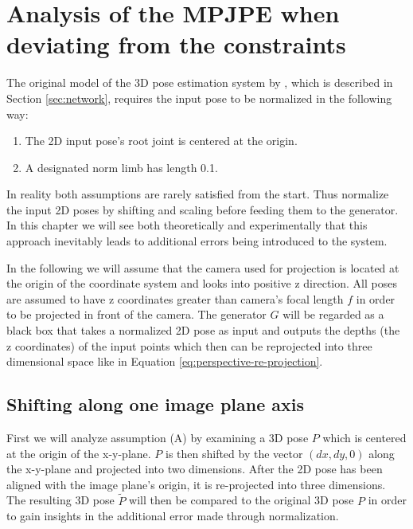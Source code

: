 \section{Analysis of the MPJPE when deviating from the constraints}

The original model of the 3D pose estimation system by \citet{drover18}, which is described in Section \ref{sec:network}, requires the input pose to be normalized in the following way:
\begin{enumerate}[label=(\Alph*)]
	\item The 2D input pose's root joint is centered at the origin.
	\item A designated norm limb has length 0.1.
\end{enumerate}

In reality both assumptions are rarely satisfied from the start.
Thus \citet{drover18} normalize the input 2D poses by shifting and scaling before feeding them to the generator.
In this chapter we will see both theoretically and experimentally that this approach inevitably leads to additional errors being introduced to the system.


In the following we will assume that the camera used for projection is located at the origin of the coordinate system and looks into positive z direction.
All poses are assumed to have z coordinates greater than camera's focal length $f$ in order to be projected in front of the camera.
The generator $G$ will be regarded as a black box that takes a normalized 2D pose as input and outputs the depths (the z coordinates) of the input points which then can be reprojected into three dimensional space like in Equation \eqref{eq:perspective-re-projection}.

\subsection{Shifting along one image plane axis}
\label{sec:x-shift-error}
First we will analyze assumption (A) by examining a 3D pose $P$ which is centered at the origin of the x-y-plane.
$P$ is then shifted by the vector $(dx, dy, 0)$ along the x-y-plane and projected into two dimensions.
After the 2D pose has been aligned with the image plane's origin, it is re-projected into three dimensions.
The resulting 3D pose $\widetilde{P}$ will then be compared to the original 3D pose $P$ in order to gain insights in the additional error made through normalization.


